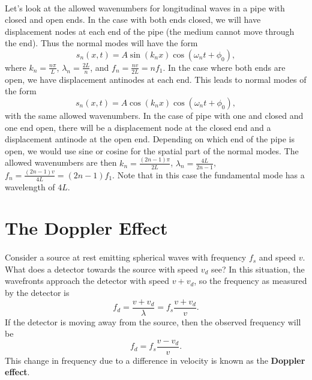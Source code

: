 \documentclass[../classical_mechanics.tex]{subfiles}
\begin{document}
        \paragraph{}
        Let's look at the allowed wavenumbers for longitudinal waves in a pipe with closed and open ends.
        In the case with both ends closed, we will have displacement nodes at each end of the pipe (the medium cannot move through the end).
        Thus the normal modes will have the form
        \begin{equation}
            s_n(x,t)=A\sin(k_n x)\cos(\omega_n t+\phi_0),
        \end{equation}
        where $k_n=\frac{n\pi}{L}$, $\lambda_n=\frac{2L}{n}$, and $f_n=\frac{nv}{2L}=nf_1$.
        In the case where both ends are open, we have displacement antinodes at each end.
        This leads to normal modes of the form
        \begin{equation}
            s_n(x,t)=A\cos(k_n x)\cos(\omega_n t+\phi_0),
        \end{equation}
        with the same allowed wavenumbers.
        In the case of pipe with one and closed and one end open, there will be a displacement node at the closed end and a displacement antinode at the open end.
        Depending on which end of the pipe is open, we would use sine or cosine for the spatial part of the normal modes.
        The allowed wavenumbers are then $k_n=\frac{(2n-1)\pi}{2L}$, $\lambda_n=\frac{4L}{2n-1}$, $f_n=\frac{(2n-1)v}{4L}=(2n-1)f_1$.
        Note that in this case the fundamental mode has a wavelength of $4L$.

    \section{The Doppler Effect}
        \paragraph{}
        Consider a source at rest emitting spherical waves with frequency $f_s$ and speed $v$.
        What does a detector towards the source with speed $v_d$ see?
        In this situation, the wavefronts approach the detector with speed $v+v_d$, so the frequency as measured by the detector is
        \begin{equation}
            f_d=\frac{v+v_d}{\lambda}=f_s\frac{v+v_d}{v}.
        \end{equation}
        If the detector is moving away from the source, then the observed frequency will be
        \begin{equation}
            f_d=f_s\frac{v-v_d}{v}.
        \end{equation}
        This change in frequency due to a difference in velocity is known as the \textbf{Doppler effect}.
\end{document}
